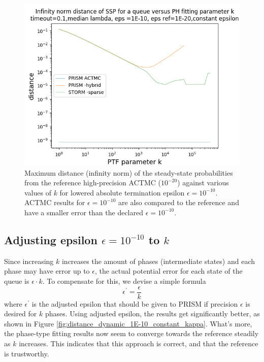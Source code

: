\documentclass[paper=a4, fontsize=11pt]{scrartcl}
\numberwithin{equation}{section}		%
\numberwithin{figure}{section}			%
\numberwithin{table}{section}				%
\begin{document}
	
	\begin{figure}[H]
		\begin{center}
			\includegraphics[trim=0.2cm 0cm 0cm 1.35cm,width=15cm, clip]{picture/New_model/1E-10/distance_constant_1E-10.png}
		\end{center}
		\caption{Maximum distance (infinity norm) of the steady-state probabilities from the reference high-precision ACTMC ($10^{-20}$) against various values of $k$ for lowered absolute termination epsilon $\epsilon = 10^{-10}$. ACTMC results for $\epsilon = 10^{-10}$ are also compared to the reference and have a smaller error than the declared $\epsilon = 10^{-10}$.}
		\label{fig:distance_constant_1E-10_constant_kappa}
	\end{figure}
	
	\pagebreak
	\subsection{Adjusting epsilon $\epsilon = 10^{-10}$ to $k$}
	\label{S:2.3}
	
	Since increasing $k$ increases the amount of phases (intermediate states) and each phase may have error up to $\epsilon$, the actual potential error for each state of the queue is $\epsilon \cdot k$. To compensate for this, we devise a simple formula
	$$\epsilon^{'} = \frac{\epsilon}{k}$$
	where $\epsilon^{'}$ is the adjusted epsilon that should be given to PRISM if precision $\epsilon$ is desired for $k$ phases.
	Using adjusted epsilon, the results get significantly better, as shown in Figure \ref{fig:distance_dynamic_1E-10_constant_kappa}. What's more, the phase-type fitting results now seem to converge towards the reference steadily as $k$ increases. This indicates that this approach is correct, and that the reference is trustworthy.
	
\end{document}
